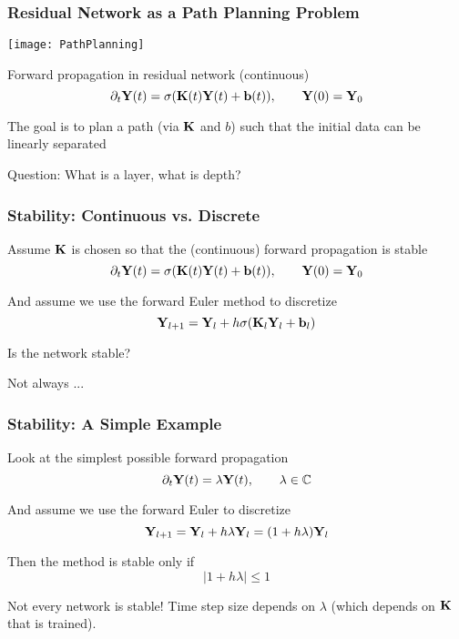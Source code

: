 \documentclass[12pt,fleqn,beamer]{beamer}
\begin{document}
\begin{frame}\frametitle{Residual Network as a Path Planning Problem}


\begin{center}
	\texttt{[image: PathPlanning]}
\end{center}

\bigskip
\pause

Forward propagation in residual network (continuous)
$$ \partial_t {\bf Y}(t) = \sigma( {\bf K}(t) {\bf Y}(t) + {\bf b}(t)), \qquad {\bf Y}(0) = {\bf Y}_0 $$

The goal is to plan a path (via ${\bf K}$ and $b$) such that the initial data can be linearly separated

\bigskip
\pause
Question: What is a layer, what is depth?


\end{frame}




\begin{frame}\frametitle{Stability: Continuous vs. Discrete}


Assume ${\bf K}$ is chosen so that the (continuous) forward propagation is stable
$$ \partial_t {\bf Y}(t) = \sigma( {\bf K}(t) {\bf Y}(t)+ {\bf b}(t)), \qquad {\bf Y}(0) = {\bf Y}_0 $$

And assume we use the forward Euler method to discretize
$$ {\bf Y}_{l+1} = {\bf Y}_{l} + h \sigma( {\bf K}_l {\bf Y}_l + {\bf b}_l) $$

Is the network stable?


\bigskip
\pause

Not always ...


\end{frame}


\begin{frame}\frametitle{Stability: A Simple Example}

Look at the simplest possible forward propagation
$$ \partial_t {\bf Y}(t) = \lambda{\bf Y}(t), \qquad \lambda \in \mathbb{C}$$

And assume we use the forward Euler to discretize
$$ {\bf Y}_{l+1} = {\bf Y}_{l} + h \lambda {\bf Y}_l = (1+h\lambda) {\bf Y}_l$$

Then the method is stable only if
$$ |1+h\lambda| \le 1 $$

\bigskip

Not every network is stable! Time step size depends on $\lambda$ (which depends on ${\bf K}$ that is trained).

\end{frame}
\end{document}
